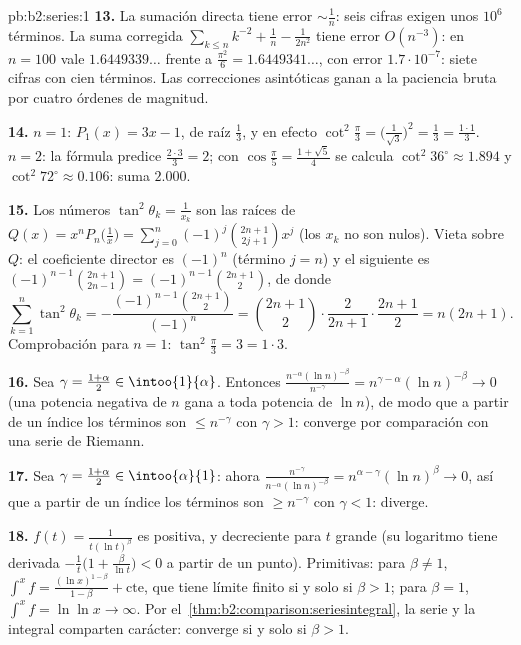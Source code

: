 \begin{solution}{pb:b2:series:1}
\textbf{13.} La sumación directa tiene error $\sim \frac1n$: seis
cifras exigen unos $10^6$ términos. La suma corregida
$\sum_{k\leq n}k^{-2} + \frac1n - \frac1{2n^2}$ tiene error
$O(n^{-3})$: en $n = 100$ vale $1.6449339\dots$ frente a
$\frac{\pi^2}6 = 1.6449341\dots$, con error $1.7\cdot10^{-7}$:
siete cifras con cien términos. Las correcciones asintóticas
ganan a la paciencia bruta por cuatro órdenes de magnitud.

\textbf{14.} $n = 1$: $P_1(x) = 3x - 1$, de raíz $\frac13$, y en
efecto $\cot^2\frac\pi3 = \bigl(\frac1{\sqrt3}\bigr)^2 = \frac13
= \frac{1\cdot1}3$. $n = 2$: la fórmula predice
$\frac{2\cdot3}3 = 2$; con $\cos\frac\pi5 = \frac{1 + \sqrt5}{4}$
se calcula $\cot^2 36^\circ \approx 1.894$ y $\cot^2 72^\circ
\approx 0.106$: suma $2.000$.

\textbf{15.} Los números $\tan^2\theta_k = \frac1{x_k}$ son las
raíces de $Q(x) = x^nP_n\bigl(\frac1x\bigr) =
\sum_{j=0}^n(-1)^j\binom{2n+1}{2j+1}x^j$ (los $x_k$ no son
nulos). Vieta sobre $Q$: el coeficiente director es $(-1)^n$
(término $j = n$) y el siguiente es
$(-1)^{n-1}\binom{2n+1}{2n-1} = (-1)^{n-1}\binom{2n+1}{2}$, de
donde
\[
\sum_{k=1}^n\tan^2\theta_k =
-\frac{(-1)^{n-1}\binom{2n+1}2}{(-1)^n} = \binom{2n+1}2\cdot
\frac{2}{2n+1}\cdot\frac{2n+1}{2}
= n(2n+1).
\]
Comprobación para $n = 1$: $\tan^2\frac\pi3 = 3 = 1\cdot3$.

\textbf{16.} Sea $\gamma = \frac{1+\alpha}2 \in
\intoo{1}{\alpha}$. Entonces $\frac{n^{-\alpha}(\ln
n)^{-\beta}}{n^{-\gamma}} = n^{\gamma - \alpha}(\ln n)^{-\beta}
\to 0$ (una potencia negativa de $n$ gana a toda potencia de $\ln
n$), de modo que a partir de un índice los términos son $\leq
n^{-\gamma}$ con $\gamma > 1$: converge por comparación con una
serie de Riemann.

\textbf{17.} Sea $\gamma = \frac{1+\alpha}2 \in
\intoo{\alpha}{1}$: ahora $\frac{n^{-\gamma}}{n^{-\alpha}(\ln
n)^{-\beta}} = n^{\alpha-\gamma}(\ln n)^{\beta} \to 0$, así que a
partir de un índice los términos son $\geq n^{-\gamma}$ con
$\gamma < 1$: diverge.

\textbf{18.} $f(t) = \frac1{t(\ln t)^\beta}$ es positiva,
 y decreciente para $t$ grande (su logaritmo tiene
derivada $-\frac1t\bigl(1 + \frac{\beta}{\ln t}\bigr) < 0$ a
partir de un punto). Primitivas: para $\beta \neq 1$, $\int^x f =
\frac{(\ln x)^{1-\beta}}{1-\beta} + \text{cte}$, que tiene límite
finito si y solo si $\beta > 1$; para $\beta = 1$, $\int^x f =
\ln\ln x \to \infty$. Por el~\cref{thm:b2:comparison:seriesintegral}, la serie y la integral
comparten carácter: converge si y solo si $\beta > 1$.


\end{solution}
